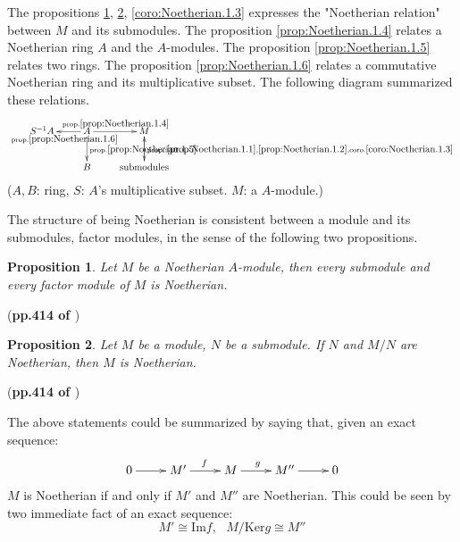 \documentclass{article}
\numberwithin{equation}{subsection} %
\newtheorem{prop}{Proposition}[section]
\theoremstyle{definition}
\begin{document}
The propositions \ref{prop:Noetherian.1.1},
\ref{prop:Noetherian.1.2}, \ref{coro:Noetherian.1.3} expresses the
"Noetherian relation" between $M$ and its submodules. The proposition
\ref{prop:Noetherian.1.4} relates a Noetherian ring $A$ and the
$A$-modules. The proposition \ref{prop:Noetherian.1.5} relates two
rings. The proposition \ref{prop:Noetherian.1.6} relates a commutative
Noetherian ring and its multiplicative subset. The following diagram
summarized these relations.
$$ \xymatrix{
S^{-1}A & A
            \ar[d]^{\text{prop.} \ref{prop:Noetherian.1.5}}
            \ar[l]^{\text{prop.} \ref{prop:Noetherian.1.6}}
            \ar[r]^{\text{prop.} \ref{prop:Noetherian.1.4}}
        & M\ar[d]^{\text{prop.}:
            \ref{prop:Noetherian.1.1},
            \ref{prop:Noetherian.1.2},
            \text{coro.} \ref{coro:Noetherian.1.3}} \\
            & B       & \text{submodules}\ar[u]
} $$
($A,B$: ring, $S$: $A$'s multiplicative subset. $M$: a $A$-module.)


The structure of being Noetherian is consistent between a module
and its submodules, factor modules, in the sense of the 
following two propositions.

\begin{prop}
    \label{prop:Noetherian.1.1}
    Let $M$ be a Noetherian $A$-module, then every submodule and
    every factor module of $M$ is Noetherian.
\end{prop}
(\textbf{pp.414 of \cite{lang}})

\begin{prop}
    \label{prop:Noetherian.1.2}
    Let $M$ be a module, $N$ be a submodule. If $N$ and $M/N$ are
    Noetherian, then $M$ is Noetherian.
\end{prop}
(\textbf{pp.414 of \cite{lang}})

The above statements could be summarized by saying that, given an
exact sequence:
\begin{align*}
    \xymatrix{
    0\ar[r] & M'\ar[r]^f & M\ar[r]^g & M''\ar[r] & 0
    }
\end{align*}
$M$ is Noetherian if and only if $M'$ and $M''$ are Noetherian.
This could be seen by two immediate fact of an exact sequence:
\[
    M'\cong \text{Im}f, \text{ } M/\text{Ker}g \cong M''
\]
\end{document}
